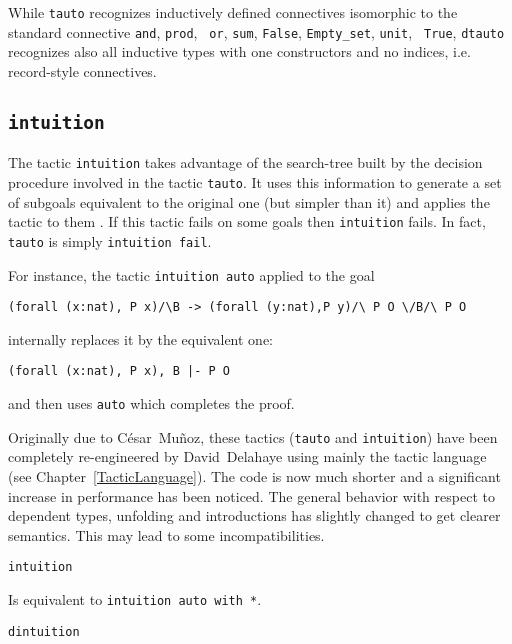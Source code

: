 \begin{coq_example*}
\begin{Variants}
  While {\tt tauto} recognizes inductively defined connectives
  isomorphic to the standard connective {\tt and}, {\tt prod}, {\tt
    or}, {\tt sum}, {\tt False}, {\tt Empty\_set}, {\tt unit}, {\tt
    True}, {\tt dtauto} recognizes also all inductive types with
  one constructors and no indices, i.e. record-style connectives.

\end{Variants}

\subsection{\tt intuition \tac}
\label{intuition}

The tactic \texttt{intuition} takes advantage of the search-tree built
by the decision procedure involved in the tactic {\tt tauto}. It uses
this information to generate a set of subgoals equivalent to the
original one (but simpler than it) and applies the tactic
{\tac} to them \cite{Mun94}. If this tactic fails on some goals then
{\tt intuition} fails. In fact, {\tt tauto} is simply {\tt intuition
  fail}.

For instance, the tactic {\tt intuition auto} applied to the goal
\begin{verbatim}
(forall (x:nat), P x)/\B -> (forall (y:nat),P y)/\ P O \/B/\ P O
\end{verbatim}
internally replaces it by the equivalent one:
\begin{verbatim}
(forall (x:nat), P x), B |- P O
\end{verbatim}
and then uses {\tt auto} which completes the proof.

Originally due to C{\'e}sar~Mu{\~n}oz, these tactics ({\tt tauto} and {\tt intuition})
have been completely re-engineered by David~Delahaye using mainly the tactic
language (see Chapter~\ref{TacticLanguage}). The code is now much shorter and
a significant increase in performance has been noticed. The general behavior
with respect to dependent types, unfolding and introductions has
slightly changed to get clearer semantics. This may lead to some
incompatibilities.

\begin{Variants}
\item {\tt intuition}

  Is equivalent to {\tt intuition auto with *}.

\item {\tt dintuition}


\end{Variants}
\end{coq_example*}
